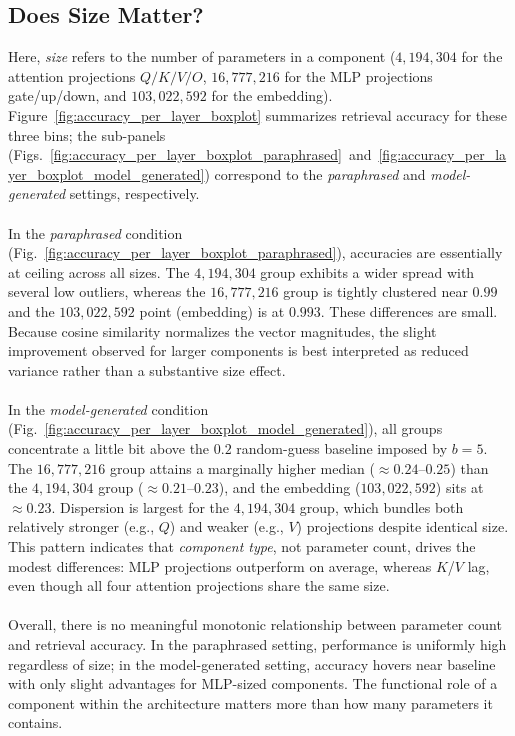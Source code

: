 \subsection{Does Size Matter?}
Here, \emph{size} refers to the number of parameters in a component ($4{,}194{,}304$ for the attention projections $Q/K/V/O$,
$16{,}777{,}216$ for the MLP projections gate/up/down, and $103{,}022{,}592$ for the embedding). Figure~\ref{fig:accuracy_per_layer_boxplot} summarizes retrieval accuracy for these three bins; the sub-panels
(Figs.~\ref{fig:accuracy_per_layer_boxplot_paraphrased}~and~\ref{fig:accuracy_per_layer_boxplot_model_generated}) correspond to the \emph{paraphrased} and \emph{model-generated} settings, respectively.
\\\\
In the \emph{paraphrased} condition (Fig.~\ref{fig:accuracy_per_layer_boxplot_paraphrased}), accuracies are essentially at ceiling across all sizes. The $4{,}194{,}304$ group exhibits a wider spread with several low outliers, whereas the $16{,}777{,}216$ group is tightly clustered near $0.99$ and the $103{,}022{,}592$ point (embedding) is at $0.993$. These differences are small. Because cosine similarity normalizes the vector magnitudes, the slight improvement observed for larger components is best interpreted as reduced variance rather than a substantive size effect.
\\\\
In the \emph{model-generated} condition
(Fig.~\ref{fig:accuracy_per_layer_boxplot_model_generated}), all groups concentrate a little bit above the $0.2$ random-guess baseline imposed by $b{=}5$. The $16{,}777{,}216$ group attains a marginally higher median ($\approx 0.24$–$0.25$) than the $4{,}194{,}304$ group ($\approx 0.21$–$0.23$), and the embedding ($103{,}022{,}592$) sits at $\approx 0.23$. Dispersion is largest for the $4{,}194{,}304$ group, which bundles both relatively stronger (e.g., $Q$) and weaker (e.g., $V$) projections despite identical size. This pattern indicates that \emph{component type}, not parameter count, drives the modest differences: MLP projections outperform on average, whereas $K$/$V$ lag, even though all four attention projections share the same size.
\\\\
Overall, there is no meaningful monotonic relationship between parameter count and retrieval accuracy. In the paraphrased setting, performance is uniformly high regardless of size; in the model-generated setting, accuracy hovers near baseline with only slight advantages for MLP-sized components. The functional role of a component within the architecture matters more than how many parameters it contains.
